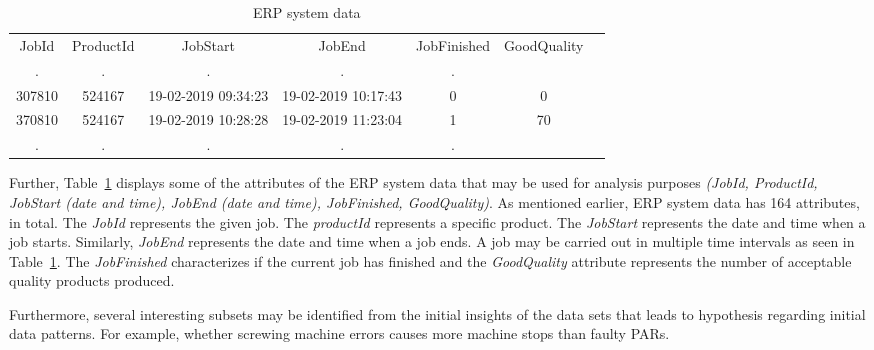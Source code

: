 \documentclass[runningheads]{llncs}
\begin{document}
\begin{table}[ht]
\caption{ERP system data}
\label{example2}
\centering
\begin{tabular}{ccccccc}
\hline\noalign{\smallskip}
JobId & ProductId & JobStart & JobEnd &  JobFinished & GoodQuality\\
\noalign{\smallskip}
\hline
\noalign{\smallskip}
. & . & . & . &  .   \\
307810  & 524167 & 19-02-2019 09:34:23  & 19-02-2019 10:17:43   & 0 & 0\\
370810  & 524167 & 19-02-2019 10:28:28  & 19-02-2019 11:23:04   & 1 & 70\\
. & . & . & . &  .   \\
\hline
\end{tabular}
\end{table}

Further, Table~\ref{example2} displays some of the attributes of the ERP system data that may be used for analysis purposes \emph{(JobId, ProductId, JobStart (date and time), JobEnd (date and time), JobFinished, GoodQuality)}. As mentioned earlier, ERP system data has 164 attributes, in total. The \emph{JobId} represents the given job. The \emph{productId} represents a specific product. The \emph{JobStart} represents the date and time when a job starts. Similarly, \emph{JobEnd} represents the date and time when a job ends. A job may be carried out in multiple time intervals as seen in Table~\ref{example2}. The \emph{JobFinished} characterizes if the current job has finished and the \emph{GoodQuality} attribute represents the number of acceptable quality products produced. 

Furthermore, several interesting subsets may be identified from the initial insights of the data sets that leads to hypothesis regarding initial data patterns. For example, whether screwing machine errors causes more machine stops than faulty PARs. 
\end{document}

